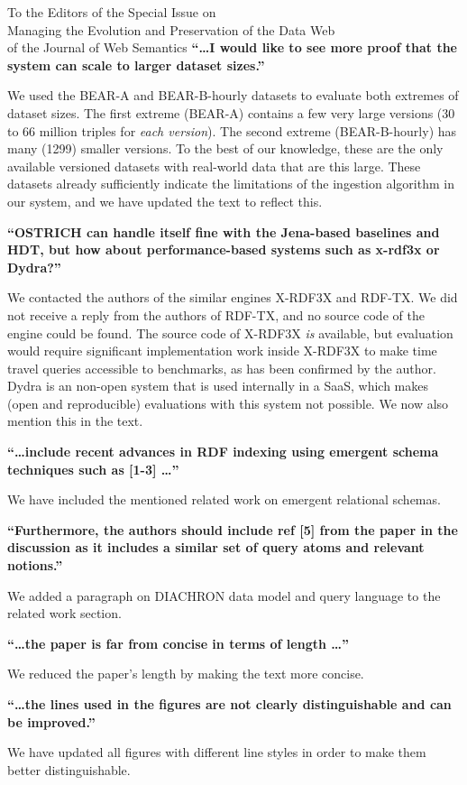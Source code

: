 \documentclass{letter}
\newcounter{section}
\begin{document}
\begin{letter}{To the Editors of the Special Issue on\\Managing the Evolution and Preservation of the Data Web\\of the Journal of Web Semantics}
\textbf{\enquote{\ldots I would like to see more proof that the system can scale to larger dataset sizes.}}

We used the BEAR-A and BEAR-B-hourly datasets to evaluate both extremes of dataset sizes.
The first extreme (BEAR-A) contains a few very large versions (30 to 66 million triples for \emph{each version}).
The second extreme (BEAR-B-hourly) has many (1299) smaller versions.
To the best of our knowledge, these are the only available versioned datasets with real-world data
that are this large.
These datasets already sufficiently indicate the limitations of the ingestion algorithm in our system,
and we have updated the text to reflect this.

\textbf{\enquote{OSTRICH can handle itself fine with the Jena-based baselines and HDT, but how about performance-based systems such as x-rdf3x or Dydra?}}

We contacted the authors of the similar engines X-RDF3X and RDF-TX.
We did not receive a reply from the authors of RDF-TX, and no source code of the engine could be found.
The source code of X-RDF3X \emph{is} available, but evaluation would require significant implementation work inside X-RDF3X
to make time travel queries accessible to benchmarks, as has been confirmed by the author.
Dydra is an non-open system that is used internally in a SaaS, which makes (open and reproducible) evaluations with this system not possible.
We now also mention this in the text.

\textbf{\enquote{\ldots include recent advances in RDF indexing using emergent schema techniques such as [1-3] \ldots}}

We have included the mentioned related work on emergent relational schemas.

\textbf{\enquote{Furthermore, the authors should include ref [5] from the paper in the discussion as it includes a similar set of query atoms and relevant notions.}}

We added a paragraph on DIACHRON data model and query language to the related work section.

\textbf{\enquote{\ldots the paper is far from concise in terms of length \ldots}}

We reduced the paper's length by making the text more concise.

\textbf{\enquote{\ldots the lines used in the figures are not clearly distinguishable and can be improved.}}

We have updated all figures with different line styles in order to make them better distinguishable.


\end{letter}
\end{document}
